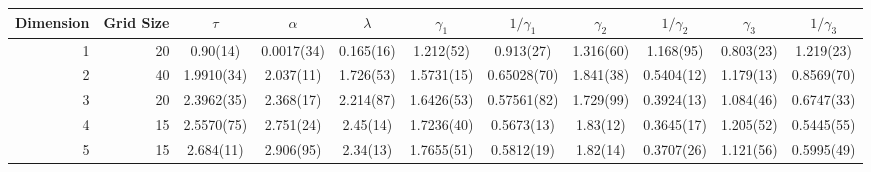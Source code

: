 \begin{tabular}{rr|ccccccccc}
\toprule
Dimension & Grid Size & $\tau$ & $\alpha$ & $\lambda$ & $\gamma_1$ & $1/\gamma_1$ & $\gamma_2$ & $1/\gamma_2$ & $\gamma_3$ & $1/\gamma_3$ \\
\midrule
1 & 20 & 0.90(14) & 0.0017(34) & 0.165(16) & 1.212(52) & 0.913(27) & 1.316(60) & 1.168(95) & 0.803(23) & 1.219(23) \\
2 & 40 & 1.9910(34) & 2.037(11) & 1.726(53) & 1.5731(15) & 0.65028(70) & 1.841(38) & 0.5404(12) & 1.179(13) & 0.8569(70) \\
3 & 20 & 2.3962(35) & 2.368(17) & 2.214(87) & 1.6426(53) & 0.57561(82) & 1.729(99) & 0.3924(13) & 1.084(46) & 0.6747(33) \\
4 & 15 & 2.5570(75) & 2.751(24) & 2.45(14) & 1.7236(40) & 0.5673(13) & 1.83(12) & 0.3645(17) & 1.205(52) & 0.5445(55) \\
5 & 15 & 2.684(11) & 2.906(95) & 2.34(13) & 1.7655(51) & 0.5812(19) & 1.82(14) & 0.3707(26) & 1.121(56) & 0.5995(49) \\
\bottomrule
\end{tabular}
